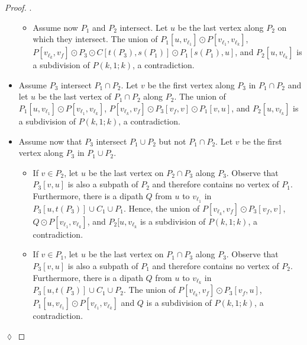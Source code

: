 \documentclass[utf8,11pt]{article}
\theoremstyle{plain}
\theoremstyle{definition}
\theoremstyle{remark}
\newenvironment{subproof}{\par\noindent {\it Subproof}.\ }{\hfill$\lozenge$\par\vspace{11pt}}
\begin{document}
\begin{proof}
\begin{subproof}
\begin{itemize}
\begin{itemize}
		\item Assume now $P_1$ and $P_2$ intersect. Let $u$ be the last vertex along $P_2$ on which they intersect. The union of $P_1[u,v_{\ell_1}]\odot P[v_{\ell_1}, v_{\ell_k}]$, $P[v_{\ell_k}, v_f]\odot P_3\odot C[t(P_3), s(P_1)]\odot P_1[s(P_1), u]$, and $P_2[u, v_{\ell_k}]$ is a subdivision of $P(k,1;k)$, a contradiction.
	\end{itemize}

	\item Assume $P_3$ intersect $P_1\cap P_2$. Let $v$ be the first vertex along $P_3$ in $P_1\cap P_2$ and let $u$ be the last vertex of $P_1\cap P_2$ along $P_2$. The union of $P_1[u,v_{\ell_1}]\odot P[v_{\ell_1}, v_{\ell_k}]$, $P[v_{\ell_k}, v_f]\odot P_3[v_f,v]\odot P_1[v, u]$, and $P_2[u, v_{\ell_k}]$ is a subdivision of $P(k,1;k)$, a contradiction.

	\item Assume now that $P_3$ intersect $P_1\cup P_2$ but not $P_1\cap P_2$. Let $v$ be the first vertex along $P_3$ in $P_1\cup P_2$.
	\begin{itemize}
	\item If $v \in P_2$, let $u$ be the last vertex on $P_2\cap P_3$ along $P_3$. Observe that $P_3[v,u]$ is also a subpath of $P_2$ and therefore contains no vertex of $P_1$. Furthermore, there is a dipath $Q$ from $u$ to $v_{\ell_1}$ in $P_3[u, t(P_3)]\cup C_1\cup  P_1$. Hence, the union of $P[v_{\ell_k}, v_f] \odot P_3[v_f,v]$, $Q\odot P[v_{\ell_1},v_{\ell_k}]$, and $P_2[u,v_{\ell_k}$ is a subdivision of $P(k,1;k)$, a contradiction.
	
	\item If $v\in P_1$, let $u$ be the last vertex on $P_1\cap P_3$ along $P_3$.  Observe that $P_3[v,u]$ is also a subpath of $P_1$ and therefore contains no vertex of $P_2$. Furthermore, there is a dipath $Q$ from $u$ to $v_{\ell_k}$ in $P_3[u, t(P_3)]\cup C_1\cup  P_2$.
	The union of $P[v_{\ell_k}, v_f] \odot P_3[v_f,u]$, $P_1[u, v_{\ell_1}]\odot P[v_{\ell_1}, v_{\ell_k}]$ and $Q$ is a subdivision of $P(k,1;k)$, a contradiction.

	\end{itemize}

\end{itemize}
\end{subproof}
\end{proof}
\end{document}

